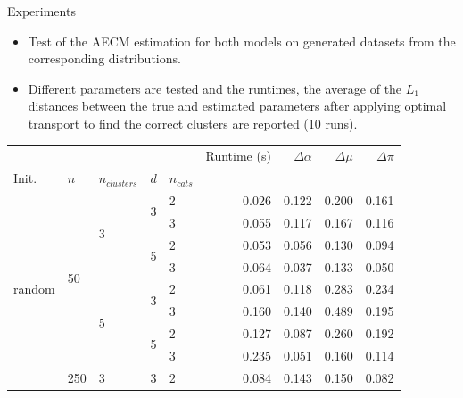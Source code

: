\documentclass{beamer}
\begin{document}
\begin{frame}{Experiments}
    \begin{itemize}
        \item Test of the AECM estimation for both models on generated datasets from the corresponding distributions.
        \item Different parameters are tested and the runtimes, the average of the $L_1$ distances between the true and estimated parameters after applying optimal transport to find the correct clusters are reported (10 runs). 
    \end{itemize}

    \begin{table}[H]
        \centering
        \begin{minipage}{.48\columnwidth}
            \centering
            \begin{adjustbox}{width=\columnwidth}
                \begin{tabular}{lllllrrrr}
                 &  &  &  &  & Runtime (s) & $\Delta \alpha$ & $\Delta \mu$ & $\Delta \pi$ \\
                Init. & $n$ & $n_{clusters}$ & $d$ & $n_{cats}$ &  &  &  &  \\
                \cline{1-9} \cline{2-9} \cline{3-9} \cline{4-9}
                \multirow[t]{16}{*}{random} & \multirow[t]{8}{*}{50} & \multirow[t]{4}{*}{3} & \multirow[t]{2}{*}{3} & 2 & 0.026 & 0.122 & 0.200 & 0.161 \\
                 &  &  &  & 3 & 0.055 & 0.117 & 0.167 & 0.116 \\
                \cline{4-9}
                 &  &  & \multirow[t]{2}{*}{5} & 2 & 0.053 & 0.056 & 0.130 & 0.094 \\
                 &  &  &  & 3 & 0.064 & 0.037 & 0.133 & 0.050 \\
                \cline{3-9} \cline{4-9}
                 &  & \multirow[t]{4}{*}{5} & \multirow[t]{2}{*}{3} & 2 & 0.061 & 0.118 & 0.283 & 0.234 \\
                 &  &  &  & 3 & 0.160 & 0.140 & 0.489 & 0.195 \\
                \cline{4-9}
                 &  &  & \multirow[t]{2}{*}{5} & 2 & 0.127 & 0.087 & 0.260 & 0.192 \\
                 &  &  &  & 3 & 0.235 & 0.051 & 0.160 & 0.114 \\
                \cline{2-9} \cline{3-9} \cline{4-9}
                 & \multirow[t]{8}{*}{250} & \multirow[t]{4}{*}{3} & \multirow[t]{2}{*}{3} & 2 & 0.084 & 0.143 & 0.150 & 0.082 \\

\end{tabular}
\end{adjustbox}
\end{minipage}
\end{table}
\end{frame}
\end{document}
